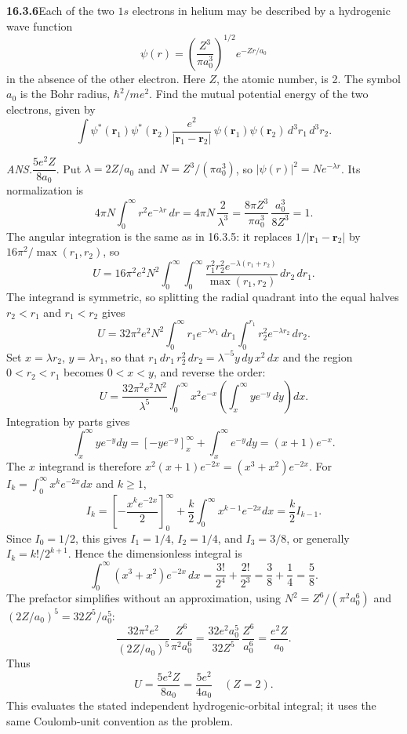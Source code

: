 \par\bigskip
\noindent\textbf{16.3.6}\quad Each of the two $1s$ electrons in
helium may be described by a hydrogenic wave function
\[
\psi(r)=\left(\frac{Z^{3}}{\pi a_{0}^{3}}\right)^{1/2}e^{-Zr/a_{0}}
\]
in the absence of the other electron. Here $Z$, the atomic number, is
2. The symbol $a_{0}$ is the Bohr radius, $\hbar^{2}/me^{2}$. Find
the mutual potential energy of the two electrons, given by
\[
\int\psi^{*}(\mathbf{r}_{1})\psi^{*}(\mathbf{r}_{2})
\frac{e^{2}}{|\mathbf{r}_{1}-\mathbf{r}_{2}|}\,
\psi(\mathbf{r}_{1})\psi(\mathbf{r}_{2})\,d^{3}r_{1}\,d^{3}r_{2}.
\]
\par\nobreak\hfill\emph{ANS.}\enspace$\dfrac{5e^{2}Z}{8a_{0}}$.
\solution
Put $\lambda=2Z/a_0$ and $N=Z^3/(\pi a_0^3)$, so
$|\psi(r)|^2=Ne^{-\lambda r}$. Its normalization is
\[
4\pi N\int_0^\infty r^2e^{-\lambda r}\,dr
=4\pi N\,\frac{2}{\lambda^3}
=\frac{8\pi Z^3}{\pi a_0^3}\,\frac{a_0^3}{8Z^3}=1.
\]
The angular integration is the same as in 16.3.5: it replaces
$1/|\mathbf r_1-\mathbf r_2|$ by $16\pi^2/\max(r_1,r_2)$, so
\[
U=16\pi^2e^2N^2\int_0^\infty\!\!\int_0^\infty
\frac{r_1^2r_2^2e^{-\lambda(r_1+r_2)}}{\max(r_1,r_2)}\,dr_2\,dr_1.
\]
The integrand is symmetric, so splitting the radial quadrant into
the equal halves $r_2<r_1$ and $r_1<r_2$ gives
\[
U=32\pi^2e^2N^2
\int_0^\infty r_1e^{-\lambda r_1}\,dr_1
\int_0^{r_1}r_2^2e^{-\lambda r_2}\,dr_2.
\]
Set $x=\lambda r_2$, $y=\lambda r_1$, so that
$r_1\,dr_1\,r_2^2\,dr_2=\lambda^{-5}y\,dy\,x^2\,dx$ and the region
$0<r_2<r_1$ becomes $0<x<y$, and reverse the order:
\[
U=\frac{32\pi^2e^2N^2}{\lambda^5}
\int_0^\infty x^2e^{-x}
\left(\int_x^\infty ye^{-y}\,dy\right)dx.
\]
Integration by parts gives
\[
\int_x^\infty ye^{-y}dy
=[-ye^{-y}]_x^\infty+\int_x^\infty e^{-y}dy
=(x+1)e^{-x}.
\]
The $x$ integrand is therefore $x^2(x+1)e^{-2x}=(x^3+x^2)e^{-2x}$.
For $I_k=\int_0^\infty x^ke^{-2x}dx$ and $k\ge1$,
\[
I_k=\left[-\frac{x^ke^{-2x}}2\right]_0^\infty
+\frac{k}{2}\int_0^\infty x^{k-1}e^{-2x}dx
=\frac{k}{2}I_{k-1}.
\]
Since $I_0=1/2$, this gives $I_1=1/4$, $I_2=1/4$, and
$I_3=3/8$, or generally $I_k=k!/2^{k+1}$.
Hence the dimensionless integral is
\[
\int_0^\infty(x^3+x^2)e^{-2x}\,dx
=\frac{3!}{2^4}+\frac{2!}{2^3}=\frac38+\frac14=\frac58.
\]
The prefactor simplifies without an approximation, using
$N^2=Z^6/(\pi^2a_0^6)$ and $(2Z/a_0)^5=32Z^5/a_0^5$:
\[
\frac{32\pi^2e^2}{(2Z/a_0)^5}
\frac{Z^6}{\pi^2a_0^6}
=\frac{32e^2a_0^5}{32Z^5}\,\frac{Z^6}{a_0^6}
=\frac{e^2Z}{a_0}.
\]
Thus
\[
\boxed{U=\frac{5e^2Z}{8a_0}
=\frac{5e^2}{4a_0}\quad(Z=2)}.
\]
This evaluates the stated independent hydrogenic-orbital integral;
it uses the same Coulomb-unit convention as the problem.

